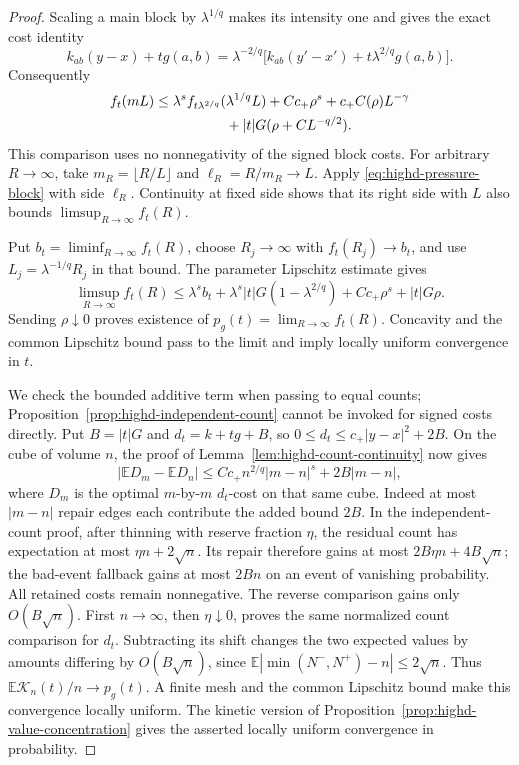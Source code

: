 \documentclass[11pt,reqno]{amsart}
\theoremstyle{definition}
\theoremstyle{remark}
\numberwithin{equation}{section}
\newcommand{\E}{\mathbb E}
\begin{document}
\begin{proof}
Scaling a main block by \(\lambda^{1/q}\) makes its intensity
one and gives the exact cost identity
\[
k_{ab}(y-x)+t g(a,b)
 =\lambda^{-2/q}\bigl[k_{ab}(y'-x')
                   +t\lambda^{2/q}g(a,b)\bigr].
\]
Consequently
\begin{equation}
\begin{split}
f_t(mL)&\le\lambda^s
 f_{t\lambda^{2/q}}(\lambda^{1/q}L)
 +Cc_+\rho^s+c_+C(\rho)L^{-\gamma}\\
&\hspace{18mm}+|t|G(\rho+CL^{-q/2}).
\end{split}
\label{eq:highd-pressure-block}
\end{equation}
This comparison uses no nonnegativity of the signed block costs.
For arbitrary \(R\to\infty\), take
\(m_R=\lfloor R/L\rfloor\) and \(\ell_R=R/m_R\to L\).
Apply \eqref{eq:highd-pressure-block} with side \(\ell_R\).
Continuity at fixed side shows that its right side with \(L\)
also bounds \(\limsup_{R\to\infty}f_t(R)\).

Put \(b_t=\liminf_{R\to\infty}f_t(R)\), choose
\(R_j\to\infty\) with \(f_t(R_j)\to b_t\), and use
\(L_j=\lambda^{-1/q}R_j\) in that bound. The parameter
Lipschitz estimate gives
\[
\limsup_{R\to\infty}f_t(R)
 \le\lambda^s b_t
 +\lambda^s|t|G(1-\lambda^{2/q})+Cc_+\rho^s+|t|G\rho.
\]
Sending \(\rho\downarrow0\) proves existence of
\(p_g(t)=\lim_{R\to\infty}f_t(R)\).
Concavity and the common Lipschitz bound pass to the limit and
imply locally uniform convergence in \(t\).

We check the bounded additive term when passing to equal counts;
Proposition~\ref{prop:highd-independent-count} cannot be invoked
for signed costs directly. Put \(B=|t|G\) and
\(d_t=k+t g+B\), so \(0\le d_t\le c_+|y-x|^2+2B\).
On the cube of volume \(n\), the proof of
Lemma~\ref{lem:highd-count-continuity} now gives
\[
|\E D_m-\E D_n|
 \le Cc_+ n^{2/q}|m-n|^s+2B|m-n|,
\]
where \(D_m\) is the optimal \(m\)-by-\(m\) \(d_t\)-cost
on that same cube. Indeed at most \(|m-n|\) repair edges each
contribute the added bound \(2B\).
In the independent-count proof, after thinning with reserve
fraction \(\eta\), the residual count has expectation at most
\(\eta n+2\sqrt n\). Its repair therefore gains at most
\(2B\eta n+4B\sqrt n\); the bad-event fallback gains at most
\(2Bn\) on an event of vanishing probability. All retained
costs remain nonnegative. The reverse comparison gains only
\(O(B\sqrt n)\). First \(n\to\infty\), then
\(\eta\downarrow0\), proves the same normalized count
comparison for \(d_t\). Subtracting its shift changes the two
expected values by amounts differing by \(O(B\sqrt n)\), since
\(\E|\min(N^-,N^+)-n|\le2\sqrt n\).
Thus \(\E\mathcal K_n(t)/n\to p_g(t)\).
A finite mesh and the common Lipschitz bound make this convergence
locally uniform. The kinetic version of
Proposition~\ref{prop:highd-value-concentration} gives the asserted
locally uniform convergence in probability.
\end{proof}
\end{document}
